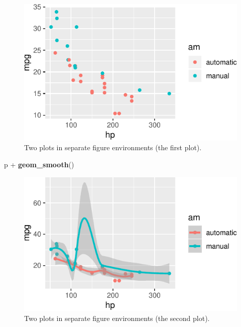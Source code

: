 \documentclass[]{tufte-handout}
\newenvironment{Shaded}{}{}
\newcommand{\KeywordTok}[1]{\textcolor[rgb]{0.00,0.44,0.13}{\textbf{#1}}}
\newcommand{\StringTok}[1]{\textcolor[rgb]{0.25,0.44,0.63}{#1}}
\newcommand{\OperatorTok}[1]{\textcolor[rgb]{0.40,0.40,0.40}{#1}}
\newcommand{\NormalTok}[1]{#1}
\begin{document}
\begin{figure}
\includegraphics{handout-twitter-analysis_files/figure-latex/fig-two-separate-1} \caption[Two plots in separate figure environments (the first plot)]{Two plots in separate figure environments (the first plot).}\label{fig:fig-two-separate1}
\end{figure}

\begin{Shaded}
\begin{Highlighting}[]
\NormalTok{p }\OperatorTok{+}\StringTok{ }\KeywordTok{geom_smooth}\NormalTok{()}
\end{Highlighting}
\end{Shaded}

\begin{figure}
\includegraphics{handout-twitter-analysis_files/figure-latex/fig-two-separate-2} \caption[Two plots in separate figure environments (the second plot)]{Two plots in separate figure environments (the second plot).}\label{fig:fig-two-separate2}
\end{figure}
\end{document}
